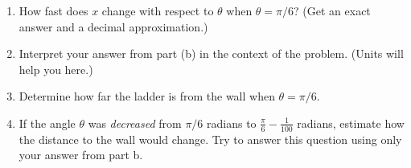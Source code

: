 \documentclass[11pt,fleqn]{article}
\begin{document}
\begin{enumerate}
\begin{enumerate}
\item How fast does $x$ change with respect to $\theta$ when $\theta = \pi/6$? (Get an exact answer and a decimal approximation.)
\vfill
\item Interpret your answer from part (b) in the context of the problem. (Units will help you here.)
\vfill
\item Determine how far the ladder is from the wall when $\theta = \pi/6.$
\vfill
\item If the angle $\theta$ was \emph{decreased} from $\pi/6$ radians to $\frac{\pi}{6} - \frac{1}{100}$ radians, estimate how the distance to the wall would change. Try to answer this question using only your answer from part b.
\vfill
\end{enumerate}

\end{enumerate}
\end{document}

